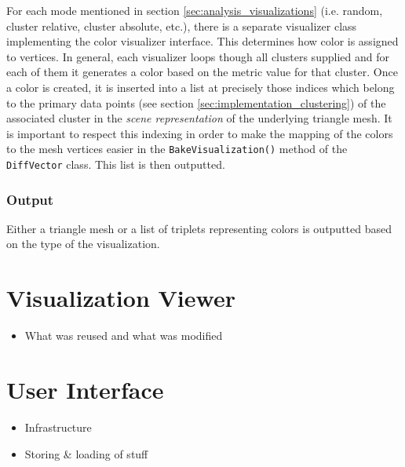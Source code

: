 For each mode mentioned in section \ref{sec:analysis_visualizations} (i.e. random, cluster relative, cluster absolute, etc.), there is a separate visualizer class implementing the color visualizer interface. This determines how color is assigned to vertices. In general, each visualizer loops though all clusters supplied and for each of them it generates a color based on the metric value for that cluster. Once a color is created, it is inserted into a list at precisely those indices which belong to the primary data points (see section \ref{sec:implementation_clustering}) of the associated cluster in the {\it scene representation} of the underlying triangle mesh. It is important to respect this indexing in order to make the mapping of the colors to the mesh vertices easier in the \verb+BakeVisualization()+ method of the \verb+DiffVector+ class. This list is then outputted.

\subsubsection{Output}

Either a triangle mesh or a list of triplets representing colors is outputted based on the type of the visualization.
\section{Visualization Viewer}

\begin{itemize}
\item What was reused and what was modified
\end{itemize}
\section{User Interface}

\begin{itemize}
\item Infrastructure
\item Storing \& loading of stuff
\end{itemize}